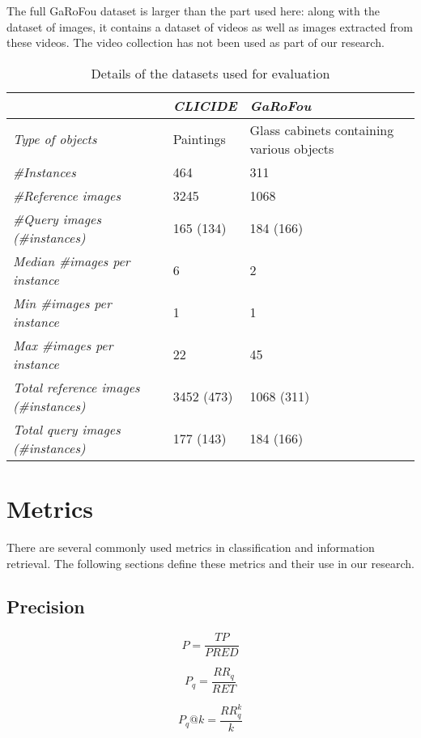 The full GaRoFou dataset is larger than the part used here: along with
the dataset of images, it contains a dataset of videos as well as images
extracted from these videos. The video collection has not been used as
part of our research.

\begin{table}
\begin{tabular}{|*{3}{l|}}
\hline & \emph{CLICIDE} & \emph{GaRoFou}\\
\hline \emph{Type of objects} & Paintings & Glass cabinets
containing various objects\\
\hline \emph{\#Instances} & 464 & 311\\
\hline \emph{\#Reference images} & 3245 & 1068\\
\hline \emph{\#Query images (\#instances)} & 165 (134) & 184 (166)\\
\hline \emph{Median \#images per instance} & 6 & 2\\
\hline \emph{Min \#images per instance} & 1 & 1\\
\hline \emph{Max \#images per instance} & 22 & 45\\
\hline \emph{Total reference images (\#instances)} & 3452 (473) & 1068 (311)\\
\hline \emph{Total query images (\#instances)} & 177 (143) & 184 (166)\\
\hline
\end{tabular}
\caption{Details of the datasets used for evaluation\label{tab:datasets}}
\end{table}

\section{Metrics}
There are several commonly used metrics in classification and information
retrieval. The following sections define these metrics and their use
in our research.

\subsection{Precision}\label{sec:precision}
\begin{equation}\label{eq:preccls}
P = \frac{TP}{PRED}
\end{equation}

\begin{equation}\label{eq:precir}
P_q = \frac{RR_q}{RET}
\end{equation}

\begin{equation}\label{eq:preck}
P_q@k = \frac{RR^k_q}{k}
\end{equation}

